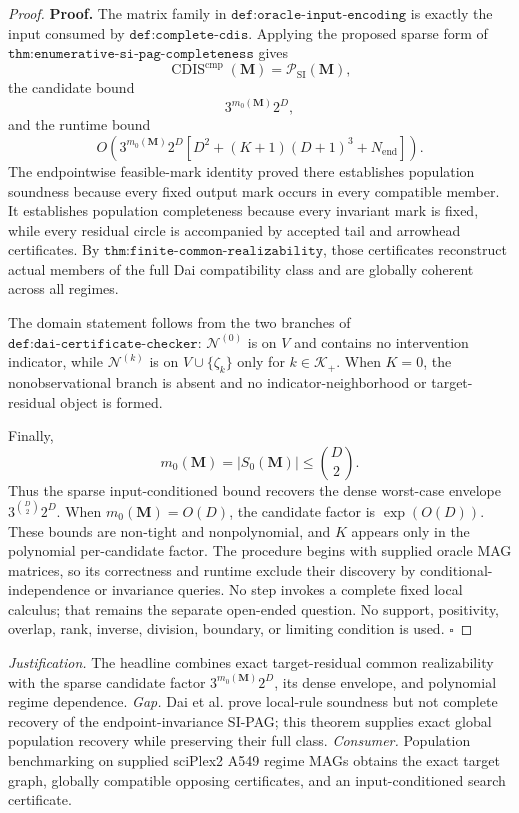 \documentclass{article}
\begin{document}
\begin{proof}
\textbf{Proof.}
The matrix family in \(\texttt{def:oracle-input-encoding}\) is exactly the input consumed by \(\texttt{def:complete-cdis}\).  Applying the proposed sparse form of \(\texttt{thm:enumerative-si-pag-completeness}\) gives
\[
\operatorname{CDIS}^{\mathrm{cmp}}(\mathbf M)
=\mathcal P_{\mathrm{SI}}(\mathbf M),
\]
the candidate bound
\[
3^{m_0(\mathbf M)}2^D,
\]
and the runtime bound
\[
O\!\left(3^{m_0(\mathbf M)}2^D
\left[D^2+(K+1)(D+1)^3+N_{\mathrm{end}}\right]\right).
\]
The endpointwise feasible-mark identity proved there establishes population soundness because every fixed output mark occurs in every compatible member.  It establishes population completeness because every invariant mark is fixed, while every residual circle is accompanied by accepted tail and arrowhead certificates.  By \(\texttt{thm:finite-common-realizability}\), those certificates reconstruct actual members of the full Dai compatibility class and are globally coherent across all regimes.

The domain statement follows from the two branches of \(\texttt{def:dai-certificate-checker}\): \(\mathcal N^{(0)}\) is on \(V\) and contains no intervention indicator, while \(\mathcal N^{(k)}\) is on \(V\cup\{\zeta_k\}\) only for \(k\in\mathcal K_+\).  When \(K=0\), the nonobservational branch is absent and no indicator-neighborhood or target-residual object is formed.

Finally,
\[
m_0(\mathbf M)=|S_0(\mathbf M)|\le\binom D2.
\]
Thus the sparse input-conditioned bound recovers the dense worst-case envelope \(3^{\binom D2}2^D\).  When \(m_0(\mathbf M)=O(D)\), the candidate factor is \(\exp(O(D))\).  These bounds are non-tight and nonpolynomial, and \(K\) appears only in the polynomial per-candidate factor.  The procedure begins with supplied oracle MAG matrices, so its correctness and runtime exclude their discovery by conditional-independence or invariance queries.  No step invokes a complete fixed local calculus; that remains the separate open-ended question.  No support, positivity, overlap, rank, inverse, division, boundary, or limiting condition is used. \(\square\)
\end{proof}
\par\smallskip\noindent \textit{Justification.} The headline combines exact target-residual common realizability with the sparse candidate factor \(3^{m_0(\mathbf M)}2^D\), its dense envelope, and polynomial regime dependence. \textit{Gap.} Dai et al. prove local-rule soundness but not complete recovery of the endpoint-invariance SI-PAG; this theorem supplies exact global population recovery while preserving their full class. \textit{Consumer.} Population benchmarking on supplied sciPlex2 A549 regime MAGs obtains the exact target graph, globally compatible opposing certificates, and an input-conditioned search certificate.
\end{document}
